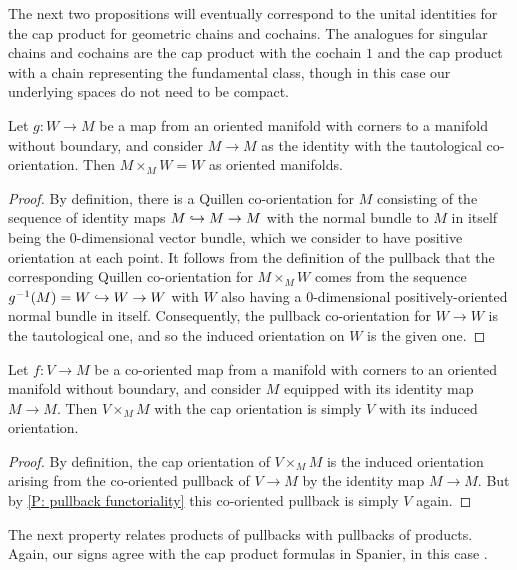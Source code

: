 The next two propositions will eventually correspond to the unital identities for the cap product for geometric chains and cochains.
The analogues for singular chains and cochains are the cap product with the cochain $1$ and the cap product with a chain representing the fundamental class, though in this case our underlying spaces do not need to be compact.

\begin{proposition}\label{P: cap with 1}
	Let $g \colon W \to M$ be a map from an oriented manifold with corners to a manifold without boundary, and consider $M \to M$ as the identity with the tautological co-orientation.
	Then $M \times_M W = W$ as oriented manifolds.
\end{proposition}

\begin{proof}
	By definition, there is a Quillen co-orientation for $M$ consisting of the sequence of identity maps $M \hookrightarrow M \to M$ with the normal bundle to $M$ in itself being the $0$-dimensional vector bundle, which we consider to have positive orientation at each point.
	It follows from the definition of the pullback that the corresponding Quillen co-orientation for $M \times_M W$ comes from the sequence $g^{-1}(M) = W \hookrightarrow W \to W$ with $W$ also having a $0$-dimensional positively-oriented normal bundle in itself.
	Consequently, the pullback co-orientation for $W \to W$ is the tautological one, and so the induced orientation on $W$ is the given one.
\end{proof}

\begin{proposition}\label{P: cap with identity M}
	Let $f \colon V \to M$ be a co-oriented map from a manifold with corners to an oriented manifold without boundary, and consider $M$ equipped with its identity map $M \to M$.
	Then $V \times_M M$ with the cap orientation is simply $V$ with its induced orientation.
\end{proposition}

\begin{proof}
	By definition, the cap orientation of $V \times_M M$ is the induced orientation arising from the co-oriented pullback of $V \to M$ by the identity map $M \to M$.
	But by \cref{P: pullback functoriality} this co-oriented pullback is simply $V$ again.
\end{proof}

The next property relates products of pullbacks with pullbacks of products. Again, our signs agree with the cap product formulas in Spanier, in this case \cite[Section 5.6.21]{Span81}.


